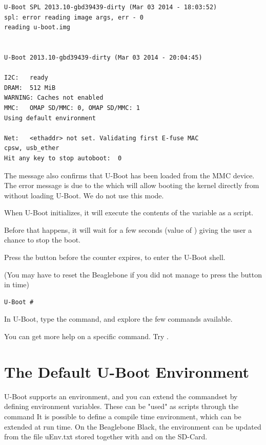 \begin{verbatim}
U-Boot SPL 2013.10-gbd39439-dirty (Mar 03 2014 - 18:03:52)
spl: error reading image args, err - 0
reading u-boot.img


U-Boot 2013.10-gbd39439-dirty (Mar 03 2014 - 20:04:45)

I2C:   ready
DRAM:  512 MiB
WARNING: Caches not enabled
MMC:   OMAP SD/MMC: 0, OMAP SD/MMC: 1
Using default environment

Net:   <ethaddr> not set. Validating first E-fuse MAC
cpsw, usb_ether
Hit any key to stop autoboot:  0 
\end{verbatim}

The message  also confirms that U-Boot has
been loaded from the MMC device. The error message is due to the  which
will allow booting the kernel directly from  without loading U-Boot. We do not use this mode.

When U-Boot initializes, it will execute the contents of the  variable as a script.

Before that happens, it will wait for a few seconds (value of ) giving
the user a chance to stop the boot. 

Press the  button before the counter expires, to enter the U-Boot shell.

(You may have to reset the Beaglebone if you did not manage to press the  button in time)
\begin{verbatim}
U-Boot #
\end{verbatim}

In U-Boot, type the  command, and explore the few commands available.

You can get more help on a specific command. Try .

\clearpage

\section{The Default U-Boot Environment}
U-Boot supports an environment, and you can extend the commandset by defining environment variables.
These can be "used" as scripts through the  command 
It is possible to define a compile time environment, which can be extended at run time.
On the Beaglebone Black, the environment can be updated from the file uEnv.txt stored
together with  and  on the SD-Card.

